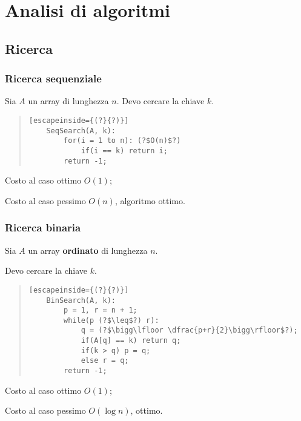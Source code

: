 \documentclass[a4paper,10pt]{article}
\theoremstyle{definition}
\begin{document}
\section{Analisi di algoritmi}
\subsection{Ricerca}
\begin{multicols}{2}
\subsubsection{Ricerca sequenziale}
Sia $A$ un array di lunghezza $n$. Devo cercare la chiave $k$. 
\begin{quote}\begin{lstlisting}[escapeinside={(?}{?)}]
	SeqSearch(A, k):
        for(i = 1 to n): (?$O(n)$?)
            if(i == k) return i;
        return -1;              
\end{lstlisting}\end{quote}


Costo al caso ottimo $O(1)$;

Costo al caso pessimo $O(n)$, algoritmo ottimo. 
\bigskip
\bigskip
\bigskip


\subsubsection{Ricerca binaria}
Sia $A$ un array \textbf{ordinato} di lunghezza $n$. 

Devo cercare la chiave $k$. 

\begin{quote}\begin{lstlisting}[escapeinside={(?}{?)}]
	BinSearch(A, k):
        p = 1, r = n + 1;
        while(p (?$\leq$?) r):
            q = (?$\bigg\lfloor \dfrac{p+r}{2}\bigg\rfloor$?);
            if(A[q] == k) return q;
            if(k > q) p = q;
            else r = q;
        return -1;
\end{lstlisting}\end{quote}

Costo al caso ottimo $O(1)$;

Costo al caso pessimo $O(\log n)$, ottimo.

\end{multicols}
\end{document}
